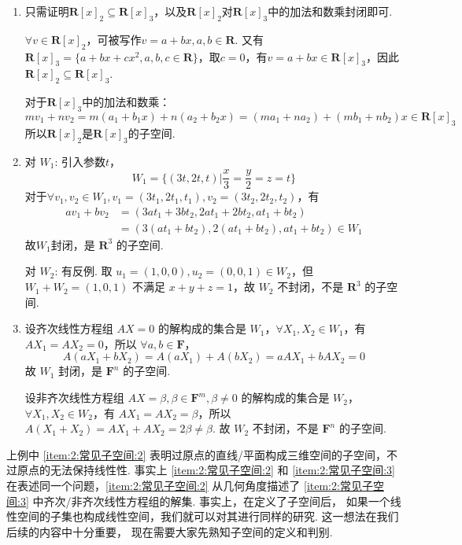 \begin{solution}
    \begin{enumerate}
        \item 只需证明$\mathbf{R}[x]_2 \subseteq \mathbf{R}[x]_3$，以及$\mathbf{R}[x]_2$对$\mathbf{R}[x]_3$中的加法和数乘封闭即可.

        $\forall v \in \mathbf{R}[x]_2$，可被写作$v=a+bx,a,b \in \mathbf{R}$. 又有$\mathbf{R}[x]_3=\{a+bx+cx^2,a,b,c \in \mathbf{R}\}$，取$c=0$，有$v=a+bx \in \mathbf{R}[x]_3$，因此$\mathbf{R}[x]_2 \subseteq \mathbf{R}[x]_3$.

        对于$\mathbf{R}[x]_3$中的加法和数乘：
        \[mv_1+nv_2=m(a_1+b_1x)+n(a_2+b_2x)=(ma_1+na_2)+(mb_1+nb_2)x \in \mathbf{R}[x]_3\]
        所以$\mathbf{R}[x]_2$是$\mathbf{R}[x]_3$的子空间.

        \item 对 $W_1$: 引入参数$t$，
        \[W_1=\{(3t,2t,t) | \frac{x}{3} = \frac{y}{2} = z = t\}\]
        对于$\forall v_1, v_2 \in W_1, v_1 = (3t_1, 2t_1, t_1), v_2 = (3t_2, 2t_2, t_2)$，有
        \begin{align*}
            av_1 + bv_2 & = (3at_1 + 3bt_2, 2at_1 + 2bt_2, at_1 + bt_2) \\ & = (3(at_1 + bt_2), 2(at_1 + bt_2), at_1 + bt_2) \in W_1
        \end{align*}
        故$W_1$封闭，是 $\mathbf{R}^3$ 的子空间.

        对 $W_2$: 有反例. 取 $u_1 = (1, 0, 0), u_2 = (0, 0, 1) \in W_2$，但 $W_1 + W_2 = (1, 0, 1)$ 不满足 $x + y + z = 1$，故 $W_2$ 不封闭，不是 $\mathbf{R}^3$ 的子空间.

        \item 设齐次线性方程组 $AX=0$ 的解构成的集合是 $W_1$，$\forall X_1, X_2 \in W_1$，有 $AX_1 = AX_2 = 0$，所以 $\forall a, b \in \mathbf{F}$，
        \[A(a X_1 + b X_2) = A(a X_1) + A(b X_2) = a AX_1 + b AX_2 = 0\]
        故 $W_1$ 封闭，是 $\mathbf{F}^n$ 的子空间.

        设非齐次线性方程组 $AX = \beta, \beta \in \mathbf{F}^m, \beta \neq 0$ 的解构成的集合是 $W_2$，$\forall X_1, X_2 \in W_2$，有 $AX_1 = AX_2 = \beta$，所以 $A(X_1 + X_2) = AX_1 + AX_2 = 2\beta \neq \beta$. 故 $W_2$ 不封闭，不是 $\mathbf{F}^n$ 的子空间.
    \end{enumerate}
\end{solution}

上例中 \ref*{item:2:常见子空间:2} 表明过原点的直线/平面构成三维空间的子空间，不过原点的无法保持线性性. 事实上 \ref*{item:2:常见子空间:2} 和 \ref*{item:2:常见子空间:3} 在表述同一个问题，\ref*{item:2:常见子空间:2} 从几何角度描述了 \ref*{item:2:常见子空间:3} 中齐次/非齐次线性方程组的解集. 事实上，在定义了子空间后， 如果一个线性空间的子集也构成线性空间，我们就可以对其进行同样的研究. 这一想法在我们后续的内容中十分重要， 现在需要大家先熟知子空间的定义和判别.

